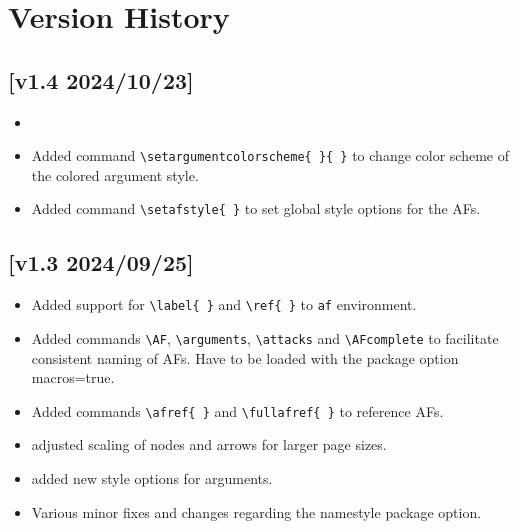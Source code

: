 \documentclass[headings=normal]{scrartcl}
\begin{document}
\newpage
\section{Version History}\label{sec:history}
\subsection*{[v1.4 2024/10/23]}
\begin{itemize}
    \item 
    \item Added command \verb|\setargumentcolorscheme{ }{ }| to change color scheme of the \textsf{colored} argument style.
    \item Added command \verb|\setafstyle{ }| to set global style options for the AFs.
\end{itemize}
\subsection*{[v1.3 2024/09/25]}
\begin{itemize}
    \item Added support for \verb|\label{ }| and \verb|\ref{ }| to \texttt{af} environment.
    \item Added commands \verb|\AF|, \verb|\arguments|, \verb|\attacks| and \verb|\AFcomplete| to facilitate consistent naming of AFs. Have to be loaded with the package option \textsf{macros=true}.
    \item Added commands \verb|\afref{ }| and \verb|\fullafref{ }| to reference AFs.
    \item adjusted scaling of nodes and arrows for larger page sizes.
    \item added new style options for arguments.
    \item Various minor fixes and changes regarding the \textsf{namestyle} package option.
\end{itemize}
\end{document}
